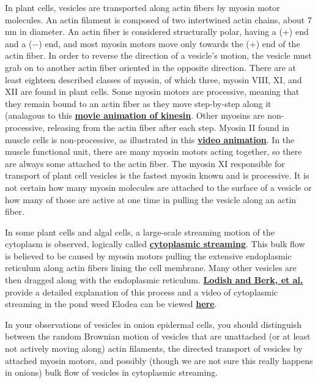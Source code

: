 \documentclass{../lab}
\begin{document}
In plant cells, vesicles are transported along actin fibers by myosin motor molecules. An actin filament is composed of two intertwined actin chains, about 7 nm in diameter. An actin fiber is considered structurally polar, having a (+) end and a ($-$) end, and most myosin motors move only towards the (+) end of the actin fiber. In order to reverse the direction of a vesicle's motion, the vesicle must grab on to another actin fiber oriented in the opposite direction. There are at least eighteen described classes of myosin, of which three, myosin VIII, XI, and XII are found in plant cells. Some myosin motors are processive, meaning that they remain bound to an actin fiber as they move step-by-step along it (analagous to this \href{http://valelab.ucsf.edu/images/movies/mov-procmotconvkinrev5.mov}{\textbf{movie animation of kinesin}}. Other myosins are non-processive, releasing from the actin fiber after each step. Myosin II found in muscle cells is non-processive, as illustrated in this \href{http://www.banyantree.org/jsale/actinmyosin/index.html}{\textbf{video animation}}. In the muscle functional unit, there are many myosin motors acting together, so there are always some attached to the actin fiber. The myosin XI responsible for transport of plant cell vesicles is the fastest myosin known and is processive. It is not certain how many myosin molecules are attached to the surface of a vesicle or how many of those are active at one time in pulling the vesicle along an actin fiber.

In some plant cells and algal cells, a large-scale streaming motion of the cytoplasm is observed, logically called \href{http://en.wikipedia.org/wiki/Cytoplasmic\_streaming}{\textbf{cytoplasmic streaming}}. This bulk flow is believed to be caused by myosin motors pulling the extensive endoplasmic reticulum along actin fibers lining the cell membrane. Many other vesicles are then dragged along with the endoplasmic reticulum. \href{http://www.ncbi.nlm.nih.gov/books/bv.fcgi?rid=mcb.figgrp.5242}{\textbf{Lodish and Berk, et al.}} provide a detailed explanation of this process and a video of cytoplasmic streaming in the pond weed Elodea can be viewed \href{http://www.microscopy-uk.org.uk/mag/imgnov00/cycloa3i.avi}{\textbf{here}}.

In your observations of vesicles in onion epidermal cells, you should distinguish between the random Brownian motion of vesicles that are unattached (or at least not actively moving along) actin filaments, the directed transport of vesicles by attached myosin motors, and possibly (though we are not sure this really happens in onions) bulk flow of vesicles in cytoplasmic streaming.
\end{document}
